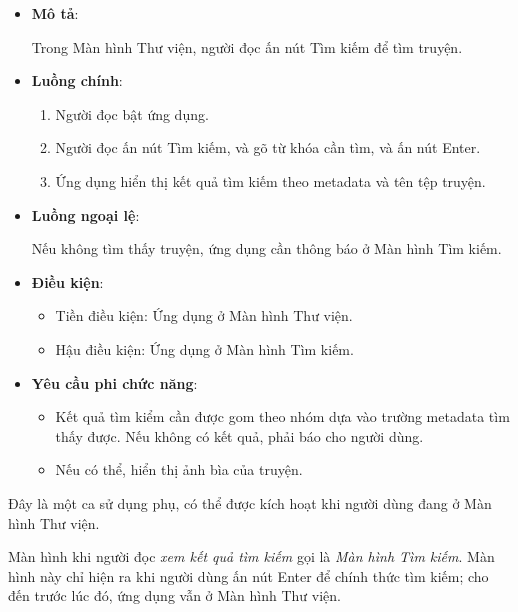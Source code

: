 \begin{itemize}
  \item
        \textbf{Mô tả}:

        Trong Màn hình Thư viện, người đọc ấn nút Tìm kiếm để tìm truyện.
  \item
        \textbf{Luồng chính}:

        \begin{enumerate}
          \def\labelenumi{\arabic{enumi}.}
          
          \item
                Người đọc bật ứng dụng.
          \item
                Người đọc ấn nút Tìm kiếm, và gõ từ khóa cần tìm, và ấn nút Enter.
          \item
                Ứng dụng hiển thị kết quả tìm kiếm theo metadata và tên tệp truyện.
        \end{enumerate}
  \item
        \textbf{Luồng ngoại lệ}:

        Nếu không tìm thấy truyện, ứng dụng cần thông báo ở Màn hình Tìm kiếm.
  \item
        \textbf{Điều kiện}:

        \begin{itemize}
          
          \item
                Tiền điều kiện: Ứng dụng ở Màn hình Thư viện.
          \item
                Hậu điều kiện: Ứng dụng ở Màn hình Tìm kiếm.
        \end{itemize}
  \item
        \textbf{Yêu cầu phi chức năng}:

        \begin{itemize}
          
          \item
                Kết quả tìm kiểm cần được gom theo nhóm dựa vào trường metadata tìm
                thấy được. Nếu không có kết quả, phải báo cho người dùng.
          \item
                Nếu có thể, hiển thị ảnh bìa của truyện.
        \end{itemize}
\end{itemize}

Đây là một ca sử dụng phụ, có thể được kích hoạt khi người dùng đang ở
Màn hình Thư viện.

Màn hình khi người đọc \emph{xem kết quả tìm kiếm} gọi là \emph{Màn hình
  Tìm kiếm}. Màn hình này chỉ hiện ra khi người dùng ấn nút Enter để chính
thức tìm kiếm; cho đến trước lúc đó, ứng dụng vẫn ở Màn hình Thư viện.

